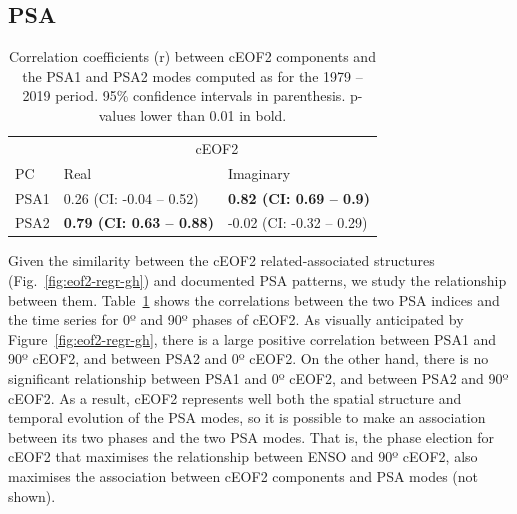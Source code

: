 \documentclass[pdflatex,lineno,sn-basic]{sn-jnl}
\theoremstyle{thmstyleone}%
\theoremstyle{thmstyletwo}%
\theoremstyle{thmstylethree}%
\begin{document}
\hypertarget{psa}{%
\subsection{PSA}\label{psa}}



\begin{table}

\caption{\label{tab:psa-eof2}Correlation coefficients (r) between cEOF2 components and the PSA1 and PSA2 modes computed as \citet{mo2001} for the 1979 -- 2019 period. 95\% confidence intervals in parenthesis. p-values lower than 0.01 in bold.}
\centering
\begin{tabular}[t]{l>{}l>{}l}
\toprule
\multicolumn{1}{c}{} & \multicolumn{2}{c}{cEOF2} \\
\cmidrule(l{3pt}r{3pt}){2-3}
PC & Real & Imaginary\\
\midrule
PSA1 & 0.26 (CI: -0.04 -- 0.52) & \textbf{0.82 (CI: 0.69 -- 0.9)}\\
PSA2 & \textbf{0.79 (CI: 0.63 -- 0.88)} & -0.02 (CI: -0.32 -- 0.29)\\
\bottomrule
\end{tabular}
\end{table}

Given the similarity between the cEOF2 related-associated structures (Fig.~\ref{fig:eof2-regr-gh}) and documented PSA patterns, we study the relationship between them.
Table~\ref{tab:psa-eof2} shows the correlations between the two PSA indices and the time series for 0º and 90º phases of cEOF2.
As visually anticipated by Figure~\ref{fig:eof2-regr-gh}, there is a large positive correlation between PSA1 and 90º cEOF2, and between PSA2 and 0º cEOF2.
On the other hand, there is no significant relationship between PSA1 and 0º cEOF2, and between PSA2 and 90º cEOF2.
As a result, cEOF2 represents well both the spatial structure and temporal evolution of the PSA modes, so it is possible to make an association between its two phases and the two PSA modes.
That is, the phase election for cEOF2 that maximises the relationship between ENSO and 90º cEOF2, also maximises the association between cEOF2 components and PSA modes (not shown).
\end{document}
